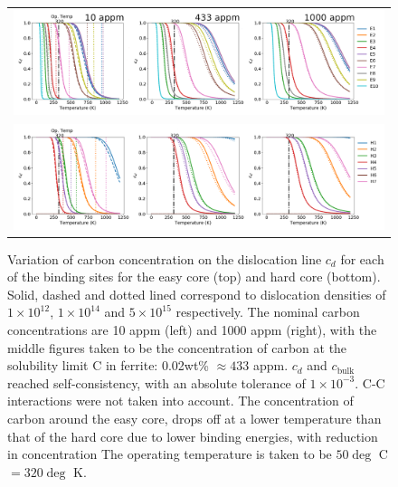 \documentclass[a4paper,11pt]{article}
\begin{document}
\begin{landscape}
   \begin{figure}	
       \begin{tabular}{c}
      	        \includegraphics[width=1.65\textwidth]{Images/cd_easy_core_ferrite_sc_all_10_433_1000_appm.png}  \\
      	        \includegraphics[width=1.65\textwidth]{Images/cd_hard_core_ferrite_sc_all_10_433_1000_appm.png}  \\

          	   \end{tabular}		
   \caption{ Variation of carbon concentration on the dislocation line $c_d$ for each of the binding sites for the easy core (top) and hard core (bottom). Solid, dashed and dotted lined correspond to dislocation densities of $1\times10^{12}$, $1\times10^{14}$ and $5\times10^{15}$ respectively. The nominal carbon concentrations are 10 appm (left) and 1000 appm (right), with the middle figures taken to be the concentration of carbon at the solubility limit C in ferrite: 0.02wt\% $\approx433$ appm. $c_d$ and $c_{\text{bulk}}$ reached self-consistency, with an absolute tolerance of $1\times10^{-3}$. C-C interactions were not taken into account. The concentration of carbon around the easy core, drops off at a lower temperature than that of the hard core due to lower binding energies, with reduction in concentration  The operating temperature is taken to be $50\deg$ C $= 320 \deg$ K. }
   \label{cdhardeasy}
      \end{figure}
      \end{landscape}
\end{document}
